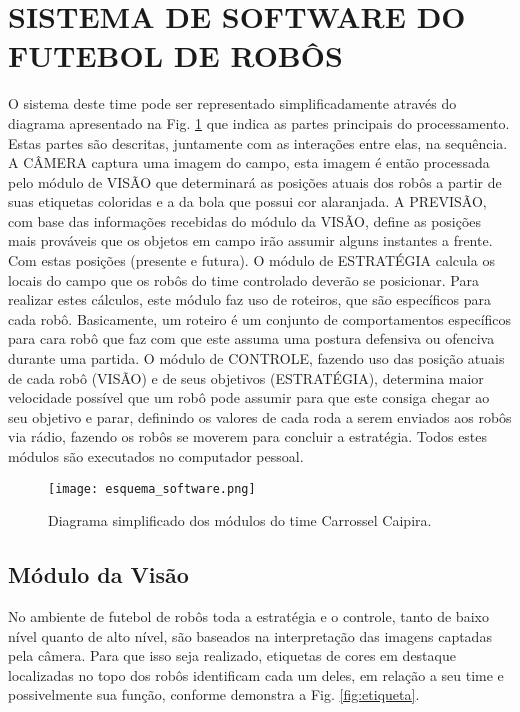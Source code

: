 \section{SISTEMA DE SOFTWARE DO FUTEBOL DE ROBÔS}

O sistema deste time pode ser representado simplificadamente através do diagrama apresentado na Fig. \ref{fig:esquema_software} que indica as partes principais do processamento. Estas partes são descritas, juntamente com as interações entre elas, na sequência. A CÂMERA captura uma imagem do campo, esta imagem é então processada pelo módulo de VISÃO que determinará as posições atuais dos robôs a partir de suas etiquetas coloridas e a da bola que possui cor alaranjada. A PREVISÃO, com base das informações recebidas do módulo da VISÃO, define as posições mais prováveis que os objetos em campo irão assumir alguns instantes a frente. Com estas posições (presente e futura). O módulo de ESTRATÉGIA calcula os locais do campo que os robôs do time controlado deverão se posicionar. Para realizar estes cálculos, este módulo faz uso de roteiros, que são específicos para cada robô. Basicamente, um roteiro é um conjunto de comportamentos específicos para cara robô que faz com que este assuma uma postura defensiva ou ofenciva durante uma partida. O módulo de CONTROLE, fazendo uso das posição atuais de cada robô (VISÃO) e de seus objetivos (ESTRATÉGIA), determina maior velocidade possível que um robô pode assumir para que este consiga chegar ao seu objetivo e parar, definindo os valores de cada roda a serem enviados aos robôs via rádio, fazendo os robôs se moverem para concluir a estratégia. Todos estes módulos são executados no computador pessoal.

\begin{figure}[!htb]
  \centering
  \texttt{[image: esquema\_software.png]}
  \caption{Diagrama simplificado dos módulos do time Carrossel Caipira.}
  \label{fig:esquema_software}
\end{figure}

\subsection{Módulo da Visão}

No ambiente de futebol de robôs toda a estratégia e o controle, tanto de baixo nível quanto de alto nível, são baseados na interpretação das imagens captadas pela câmera. Para que isso seja realizado, etiquetas de cores em destaque localizadas no topo dos robôs identificam cada um deles, em relação a seu time e possivelmente sua função, conforme demonstra a Fig. \ref{fig:etiqueta}.

